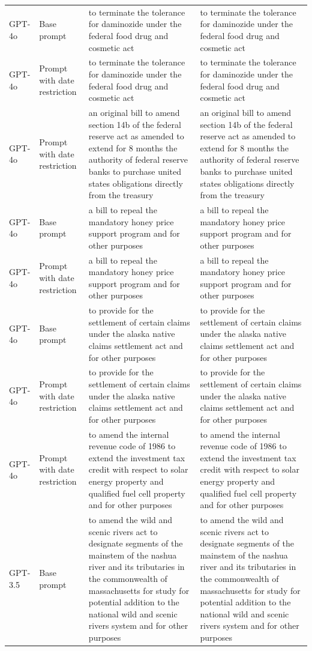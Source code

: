 \begin{longtable}{>{\raggedright\arraybackslash}p{1.4cm}>{\raggedright\arraybackslash}p{1.4cm}>{\raggedright\arraybackslash}p{5.5cm}>{\raggedright\arraybackslash}p{5.5cm}}
GPT-4o & Base prompt & to terminate the tolerance for daminozide under the federal food drug and cosmetic act & to terminate the tolerance for daminozide under the federal food drug and cosmetic act\\
GPT-4o & Prompt with date restriction & to terminate the tolerance for daminozide under the federal food drug and cosmetic act & to terminate the tolerance for daminozide under the federal food drug and cosmetic act\\
GPT-4o & Prompt with date restriction & an original bill to amend section 14b of the federal reserve act as amended to extend for 8 months the authority of federal reserve banks to purchase united states obligations directly from the treasury & an original bill to amend section 14b of the federal reserve act as amended to extend for 8 months the authority of federal reserve banks to purchase united states obligations directly from the treasury\\
GPT-4o & Base prompt & a bill to repeal the mandatory honey price support program and for other purposes & a bill to repeal the mandatory honey price support program and for other purposes\\
GPT-4o & Prompt with date restriction & a bill to repeal the mandatory honey price support program and for other purposes & a bill to repeal the mandatory honey price support program and for other purposes\\
GPT-4o & Base prompt & to provide for the settlement of certain claims under the alaska native claims settlement act and for other purposes & to provide for the settlement of certain claims under the alaska native claims settlement act and for other purposes\\
GPT-4o & Prompt with date restriction & to provide for the settlement of certain claims under the alaska native claims settlement act and for other purposes & to provide for the settlement of certain claims under the alaska native claims settlement act and for other purposes\\
GPT-4o & Prompt with date restriction & to amend the internal revenue code of 1986 to extend the investment tax credit with respect to solar energy property and qualified fuel cell property and for other purposes & to amend the internal revenue code of 1986 to extend the investment tax credit with respect to solar energy property and qualified fuel cell property and for other purposes\\
GPT-3.5 & Base prompt & to amend the wild and scenic rivers act to designate segments of the mainstem of the nashua river and its tributaries in the commonwealth of massachusetts for study for potential addition to the national wild and scenic rivers system and for other purposes & to amend the wild and scenic rivers act to designate segments of the mainstem of the nashua river and its tributaries in the commonwealth of massachusetts for study for potential addition to the national wild and scenic rivers system and for other purposes\\

\end{longtable}
